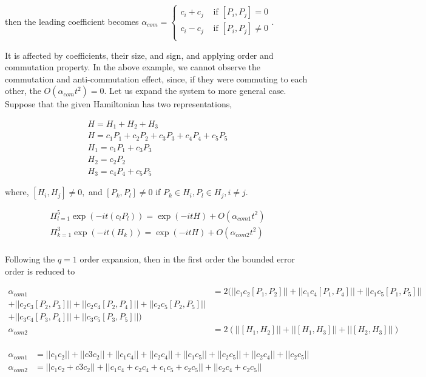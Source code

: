 \documentclass[a4paper,12pt]{article}
\begin{document}
then the leading coefficient becomes $\alpha_{com} = \begin{cases}
    c_i + c_j & \mbox{ if } [P_i, P_j] = 0 \\
    c_i - c_j & \mbox{ if } [P_i, P_j] \neq 0 \\
\end{cases}$.

It is affected by coefficients, their size, and sign, and 
applying order and commutation property.
In the above example, we cannot observe the commutation and anti-commutation
effect, since, if they were commuting to each other, the $O(\alpha_{com} t^2) = 0$.
Let us expand the system to more general case.
Suppose that the given Hamiltonian has two representations,

\begin{align}
    H = H_1 + H_2 + H_3  \\
    H =  c_1 P_1 + c_2 P_2 + c_3 P_3 + c_4 P_4 + c_5 P_5\\
    H_1 = c_1 P_1 + c_3 P_3 \\
    H_2 = c_2 P_2\\
    H_3 = c_4 P_4 + c_5 P_5
\end{align}

where, $[H_i, H_j] \neq 0,$ and 
$[P_k, P_l] \neq 0$ if $P_k \in H_i, P_l \in H_j, i \neq j$.

\begin{align}
    \Pi_{l=1}^5 \exp(- i t (c_l P_l)) = \exp(-it H) + O(\alpha_{com 1} t^2)\\
    \Pi_{k=1}^3 \exp(- i t (H_k)) = \exp(-it H) + O(\alpha_{com 2} t^2)\\
\end{align}


Following the $q=1$ order expansion, then in the first order the bounded error 
order is reduced to 

\begin{align}
    \alpha_{com1} &= 2(|| c_1 c_2 [P_1, P_2]|| + || c_1 c_4 [P_1, P_4]|| + || c_1 c_5 [P_1, P_5]|| \\
    + || c_2 c_3 [P_2, P_3]|| + || c_2 c_4 [P_2, P_4]|| + || c_2 c_5 [P_2, P_5]|| \\
    + || c_3 c_4 [P_3, P_4]|| + || c_3 c_5 [P_3, P_5]||)\\
    \alpha_{com2} &= 2(|| [H_1, H_2]|| + || [H_1, H_3]|| + || [H_2, H_3]||) \\
\end{align}


\begin{align}
    \alpha_{com1} &= ||c_1 c_2|| + ||c3 c_2|| + ||c_1 c_4|| + ||c_2 c_4|| + ||c_1 c_5|| + ||c_2 c_5||  + ||c_2 c_4|| + ||c_2 c_5||\\
    \alpha_{com2} &= ||c_1 c_2 + c3 c_2|| + ||c_1 c_4 + c_2 c_4 + c_1 c_5 + c_2 c_5||  + ||c_2 c_4 + c_2 c_5||
\end{align}
\end{document}
